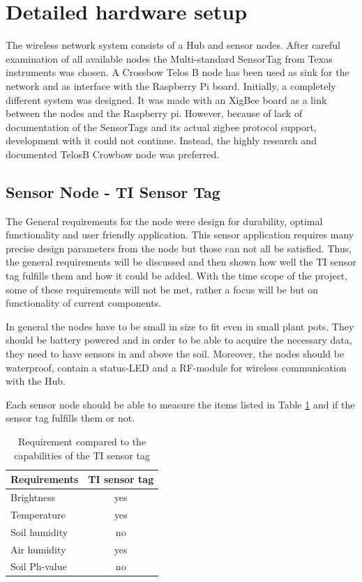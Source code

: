 \section{Detailed hardware setup}

The wireless network system consists of a Hub and sensor nodes. After careful examination of all available nodes the Multi-standard SensorTag from Texas instruments \cite{TIsensortag} was chosen. A Crossbow Telos B node has been used as sink for the network and as interface with the Raspberry Pi board. 
Initially, a completely different system was designed. It was made with an XigBee board as a link between the nodes and the Raspberry pi. However, because of lack of documentation of the SensorTags and its actual zigbee protocol support, development with it could not continue. Instead, the highly research and documented TelosB Crowbow node was preferred.


\subsection{Sensor Node - TI Sensor Tag}

The General requirements for the node were design for durability, optimal functionality and user friendly application. This sensor application requires many precise design parameters from the node but those can not all be satisfied. Thus, the general requirements will be discussed and then shown how well the TI sensor tag fulfills them and how it could be added. With the time scope of the project, some of these requirements will not be met, rather a focus will be but on functionality of current components.

In general the nodes have to be small in size to fit even in small plant pots. They should be battery powered and in order to be able to acquire the necessary data, they need to have sensors in and above the soil. Moreover, the nodes should be waterproof, contain a status-LED and a RF-module for wireless communication with the Hub.

Each sensor node should be able to measure the items listed in Table \ref{list-req} and if the sensor tag fulfills them or not.
\begin{table}[htbp]
	\centering
	\begin{tabular}{lc}
		\toprule
		Requirements & \multicolumn{1}{l}{TI sensor tag} \\ 
		\midrule
		Brightness & yes \\ 
		Temperature & yes \\ 
		Soil humidity & no \\ 
		Air humidity & yes \\ 
		Soil Ph-value & no \\
		\bottomrule 
	\end{tabular}
	\vspace{0.1cm}
	\caption{Requirement compared to the capabilities of the TI sensor tag}
	\label{list-req}
\end{table}


